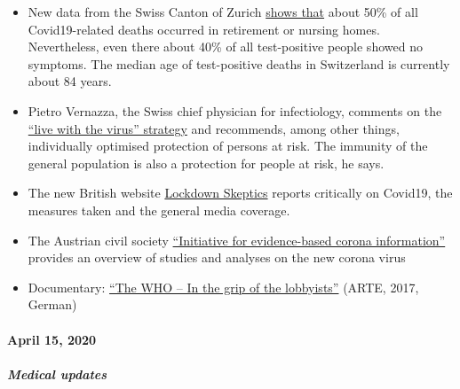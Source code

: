 \begin{itemize}
{  times more people} had the corona virus than originally thought, as
  they developed no or only mild symptoms. The actual immunization rate
  is 22\%.
\item
  New data from the Swiss Canton of Zurich
  \href{https://www.nzz.ch/zuerich/coronavirus-zuerich-aendert-nun-das-testregime-in-heimenauch-viele-aeltere-covid-19-infizierte-entwickeln-keine-symptome-zuerich-aendert-nun-das-testregime-in-heimen-ld.1552089}{shows
  that} about 50\% of all Covid19-related deaths occurred in retirement
  or nursing homes. Nevertheless, even there about 40\% of all
  test-positive people showed no symptoms. The median age of
  test-positive deaths in Switzerland is currently about 84 years.
\item
  Pietro Vernazza, the Swiss chief physician for infectiology, comments
  on the \href{https://infekt.ch/2020/04/exitstrategie-lockdown/}{``live
  with the virus'' strategy} and recommends, among other things,
  individually optimised protection of persons at risk. The immunity of
  the general population is also a protection for people at risk, he
  says.
\item
  The new British website \href{https://lockdownsceptics.org/}{Lockdown
  Skeptics} reports critically on Covid19, the measures taken and the
  general media coverage.
\item
  The Austrian civil society
  \href{https://www.initiative-corona.info/}{``Initiative for
  evidence-based corona information''} provides an overview of studies
  and analyses on the new corona virus
\item
  Documentary: \href{https://www.youtube.com/watch?v=dYlia_fQOLk}{``The
  WHO -- In the grip of the lobbyists''} (ARTE, 2017, German)
\end{itemize}

\hypertarget{april-15-2020}{%
\paragraph{April 15, 2020}\label{april-15-2020}}

\hypertarget{medical-updates-3}{%
\subparagraph{\texorpdfstring{\textbf{Medical
updates}}{Medical updates}}\label{medical-updates-3}}

